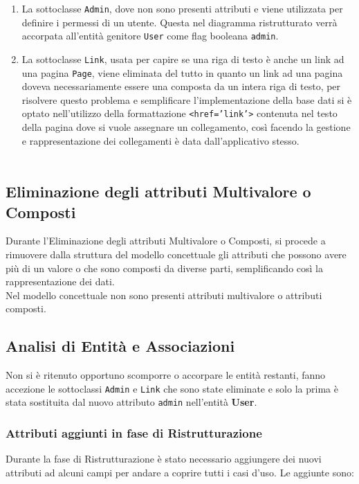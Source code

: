 \documentclass{article}
\begin{document}
	\begin{enumerate}
	\item 	
		La sottoclasse \texttt{Admin}, dove non sono presenti attributi e viene utilizzata per definire i permessi di un utente. Questa nel diagramma ristrutturato verr\`a accorpata all'entit\`a genitore \texttt{User} come flag booleana \texttt{admin}. 
	\item 
		La sottoclasse \texttt{Link}, usata per capire se una riga di testo è anche un link ad una pagina \texttt{Page}, viene eliminata del tutto in quanto un link ad una pagina doveva necessariamente essere una composta da un intera riga di testo, per risolvere questo problema e semplificare l'implementazione della base dati si è optato nell'utilizzo della formattazione \texttt{<href='link'>} contenuta nel testo della pagina dove si vuole assegnare un collegamento, cos\`i facendo la gestione e rappresentazione dei collegamenti è data dall'applicativo stesso.		
		\\\\
	\end{enumerate}
	
	
	\subsection{Eliminazione degli attributi Multivalore o Composti}
	Durante l'Eliminazione degli attributi Multivalore o Composti, si procede a rimuovere dalla struttura del modello concettuale gli attributi che possono avere più di un valore o che sono composti da diverse parti, semplificando così la rappresentazione dei dati.	
	\\
	Nel modello concettuale non sono presenti attributi multivalore o attributi composti.
	\\
	
	
	\subsection{Analisi di Entità e Associazioni}
	Non si è ritenuto opportuno scomporre o accorpare le entità restanti, fanno accezione le sottoclassi \texttt{Admin} e \texttt{Link} che sono state eliminate e solo la prima è stata sostituita dal nuovo attributo \texttt{admin} nell'entità \textbf{User}.
	\\
	
	\subsubsection{Attributi aggiunti in fase di Ristrutturazione}
	Durante la fase di Ristrutturazione è stato necessario aggiungere dei nuovi attributi ad alcuni campi per andare a coprire tutti i casi d'uso. Le aggiunte sono:
	
\end{document}
